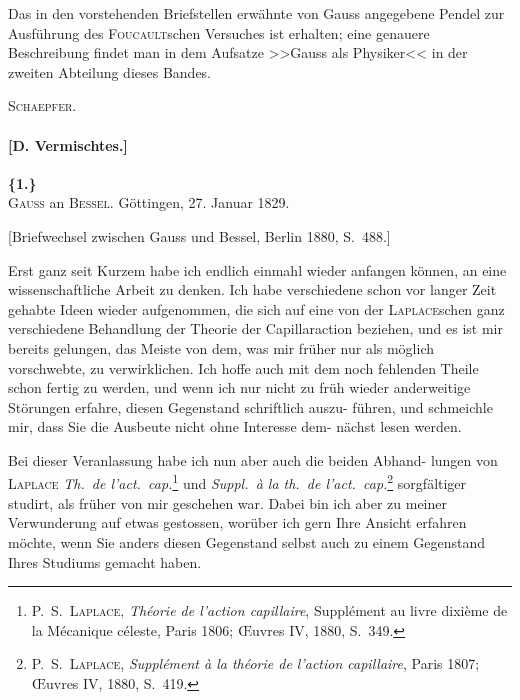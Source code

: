 \documentclass[12pt,a4paper]{article}
\theoremstyle{plain}
\theoremstyle{definition}
\theoremstyle{remark}
\begin{document}
\noindent Das in den vorstehenden Briefstellen erw\"ahnte von Gauss angegebene Pendel zur Ausf\"uhrung des
\textsc{Foucault}schen Versuches ist erhalten; eine genauere Beschreibung findet man in dem Aufsatze >>Gauss als
Physiker<< in der zweiten Abteilung dieses Bandes.

\begin{flushright}
\textsc{Schaepfer.}
\end{flushright}

\newpage


\paragraph*{[D. Vermischtes.]}

\vspace{0.5cm}

\noindent\textbf{\{1.\}}\\
\textsc{Gauss} an \textsc{Bessel}. G\"ottingen, 27. Januar 1829.

\vspace{0.2cm}
{\small[Briefwechsel zwischen Gauss und Bessel, Berlin 1880, S.~488.]}

\vspace{0.3cm}

Erst ganz seit Kurzem habe ich endlich einmahl wieder anfangen k\"onnen,
an eine wissenschaftliche Arbeit zu denken. Ich habe verschiedene schon vor
langer Zeit gehabte Ideen wieder aufgenommen, die sich auf eine von der
\textsc{Laplace}schen ganz verschiedene Behandlung der Theorie der Capillaraction
beziehen, und es ist mir bereits gelungen, das Meiste von dem, was mir fr\"uher
nur als m\"oglich vorschwebte, zu verwirklichen. Ich hoffe auch mit dem noch
fehlenden Theile schon fertig zu werden, und wenn ich nur nicht zu fr\"uh
wieder anderweitige St\"orungen erfahre, diesen Gegenstand schriftlich auszu-
f\"uhren, und schmeichle mir, dass Sie die Ausbeute nicht ohne Interesse dem-
n\"achst lesen werden.

Bei dieser Veranlassung habe ich nun aber auch die beiden Abhand-
lungen von \textsc{Laplace} \textit{Th.~de l'act.~cap.}\footnote{P.~S.~\textsc{Laplace}, \textit{Th\'eorie de l'action capillaire}, Suppl\'ement au livre dixi\`eme de la M\'ecanique
c\'eleste, Paris 1806; \OE uvres IV, 1880, S.~349.} und \textit{Suppl.~\`a la th.~de l'act.~cap.}\footnote{P.~S.~\textsc{Laplace}, \textit{Suppl\'ement \`a la th\'eorie de l'action capillaire}, Paris 1807; \OE uvres IV, 1880, S.~419.}
sorgf\"altiger studirt, als fr\"uher von mir geschehen war. Dabei bin ich aber
zu meiner Verwunderung auf etwas gestossen, wor\"uber ich gern Ihre Ansicht
erfahren m\"ochte, wenn Sie anders diesen Gegenstand selbst auch zu einem
Gegenstand Ihres Studiums gemacht haben.
\end{document}
